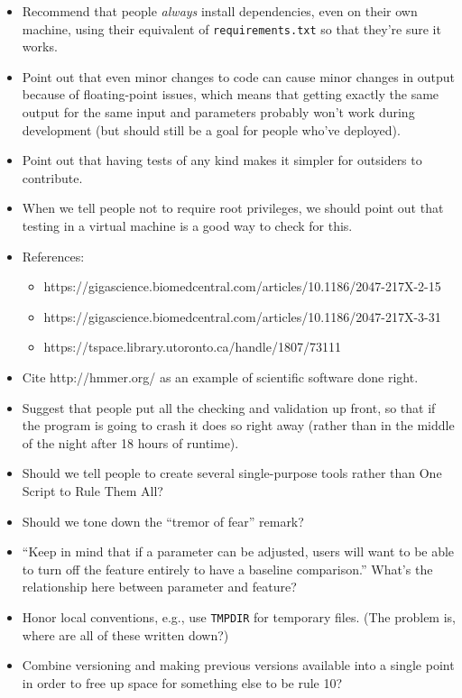 \documentclass[10pt,letterpaper]{article}
\begin{document}
\begin{itemize}

\item
Recommend that people \emph{always} install dependencies, even on their own machine,
using their equivalent of \texttt{requirements.txt}
so that they're sure it works.

\item
Point out that even minor changes to code can cause minor changes in output
because of floating-point issues,
which means that getting exactly the same output for the same input and parameters
probably won't work during development
(but should still be a goal for people who've deployed).

\item
Point out that having tests of any kind makes it simpler for outsiders to contribute.

\item
When we tell people not to require root privileges,
we should point out that testing in a virtual machine is a good way to check for this.

\item
References:
  \begin{itemize}
  \item https://gigascience.biomedcentral.com/articles/10.1186/2047-217X-2-15
  \item https://gigascience.biomedcentral.com/articles/10.1186/2047-217X-3-31
  \item https://tspace.library.utoronto.ca/handle/1807/73111
  \end{itemize}

\item
Cite http://hmmer.org/ as an example of scientific software done right.

\item
Suggest that people put all the checking and validation up front,
so that if the program is going to crash it does so right away
(rather than in the middle of the night after 18 hours of runtime).

\item
Should we tell people to create several single-purpose tools
rather than One Script to Rule Them All?

\item
Should we tone down the ``tremor of fear'' remark?

\item
``Keep in mind that if a parameter can be adjusted,
users will want to be able to turn off the feature entirely to have a baseline comparison.''
What's the relationship here between parameter and feature?

\item
Honor local conventions,
e.g.,
use \texttt{TMPDIR} for temporary files.
(The problem is,
where are all of these written down?)

\item
Combine versioning and making previous versions available into a single point
in order to free up space for something else to be rule 10?

\end{itemize}
\end{document}
